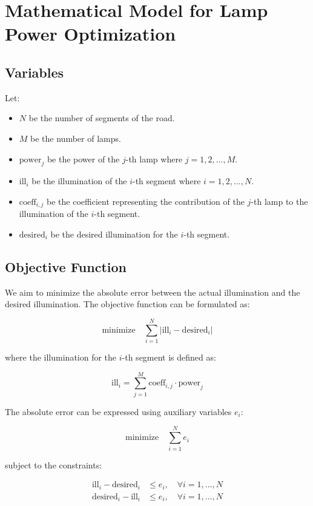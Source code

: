 \documentclass{article}
\begin{document}
\section*{Mathematical Model for Lamp Power Optimization}

\subsection*{Variables}
Let:
\begin{itemize}
    \item \( N \) be the number of segments of the road.
    \item \( M \) be the number of lamps.
    \item \( \text{power}_j \) be the power of the \( j \)-th lamp where \( j = 1, 2, \ldots, M \).
    \item \( \text{ill}_i \) be the illumination of the \( i \)-th segment where \( i = 1, 2, \ldots, N \).
    \item \( \text{coeff}_{i,j} \) be the coefficient representing the contribution of the \( j \)-th lamp to the illumination of the \( i \)-th segment.
    \item \( \text{desired}_i \) be the desired illumination for the \( i \)-th segment.
\end{itemize}

\subsection*{Objective Function}
We aim to minimize the absolute error between the actual illumination and the desired illumination. The objective function can be formulated as:

\[
\text{minimize} \quad \sum_{i=1}^{N} \left| \text{ill}_i - \text{desired}_i \right|
\]

where the illumination for the \( i \)-th segment is defined as:

\[
\text{ill}_i = \sum_{j=1}^{M} \text{coeff}_{i,j} \cdot \text{power}_j
\]

The absolute error can be expressed using auxiliary variables \( e_i \):

\[
\text{minimize} \quad \sum_{i=1}^{N} e_i
\]

subject to the constraints:

\[
\begin{align*}
\text{ill}_i - \text{desired}_i & \leq e_i, \quad \forall i = 1, \ldots, N \\
\text{desired}_i - \text{ill}_i & \leq e_i, \quad \forall i = 1, \ldots, N \\
\end{align*}
\]
\end{document}
